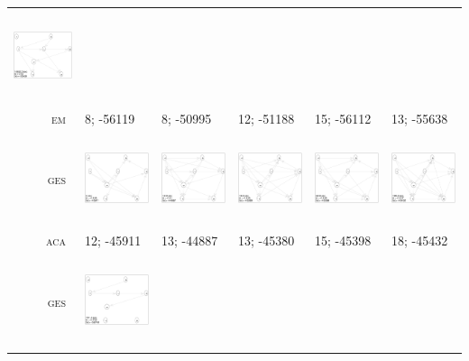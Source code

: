\begin{table}[!p]
\begin{tabular}{r@{}p{2.9cm}@{}p{2.9cm}@{}p{2.9cm}@{}p{2.9cm}@{}p{2.90cm}}
\includegraphics[width=29.34mm, height=26.7mm]{fig/GS-EM-10000} \\
\textsc{em~}
& 8; -56119 & 8; -50995 & 12; -51188 & 15; -56112 & 13; -55638 \\
\textsc{ges~} &
\includegraphics[width=29.34mm, height=26.7mm]{fig/GES-ACA-500} &
\includegraphics[width=29.34mm, height=26.7mm]{fig/GES-ACA-1000} &
\includegraphics[width=29.34mm, height=26.7mm]{fig/GES-ACA-2000} &
\includegraphics[width=29.34mm, height=26.7mm]{fig/GES-ACA-5000} &
\includegraphics[width=29.34mm, height=26.7mm]{fig/GES-ACA-10000} \\
\textsc{aca~}
& 12; -45911 & 13; -44887 & 13; -45380 & 15; -45398 & 18; -45432 \\
\textsc{ges~} &
\includegraphics[width=29.34mm, height=26.7mm]{fig/GES-EM-500} &

\end{tabular}
\end{table}
